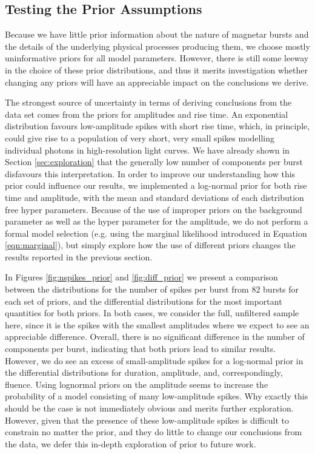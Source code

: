 \documentclass[12pt]{emulateapj}
\begin{document}
\subsection{Testing the Prior Assumptions}

Because we have little prior information about the nature of magnetar bursts and the details of
the underlying physical processes producing them, we choose mostly uninformative priors for all model parameters. However,
there is still some leeway in the choice of these prior distributions, and thus it merits investigation whether changing
any priors will have an appreciable impact on the conclusions we derive. 

The strongest source of uncertainty in terms of deriving conclusions from the data set comes from the priors for
amplitudes and rise time. An exponential distribution favours low-amplitude spikes with short rise time, which, in principle,
could give rise to a population of very short, very small spikes modelling individual photons in high-resolution light curves. We have already shown in 
Section \ref{sec:exploration} that the generally low number of components per burst disfavours this interpretation. In order
to improve our understanding how this prior could influence our results, we implemented a log-normal prior for both rise time
and amplitude, with the mean and standard deviations of each distribution free hyper parameters. Because of the use of improper priors
on the background parameter as well as the hyper parameter for the amplitude, we do not perform a formal model selection
(e.g. using the marginal likelihood introduced in Equation \ref{eqn:marginal}), but simply explore how the use of different priors
changes the results reported in the previous section.







In Figures \ref{fig:nspikes_prior} and \ref{fig:diff_prior} we present a comparison between the distributions for the number of spikes 
per burst from $82$ bursts for each set of priors, and the differential distributions for the most important quantities for both priors.
In both cases, we consider the full, unfiltered sample here, since it is the spikes with the smallest amplitudes where we expect to see
an appreciable difference. Overall, there is no significant difference in the number of components per burst, indicating that both 
priors lead to similar results. However, we do see an excess of small-amplitude spikes for a log-normal prior in the differential 
distributions for duration, amplitude, and, correspondingly, fluence. Using lognormal priors on the amplitude seems to increase
the probability of a model consisting of many low-amplitude spikes. Why exactly this should be the case is not immediately 
obvious and merits further exploration. However, given that the presence of these low-amplitude spikes is difficult to constrain no matter
the prior, and they do little to change our conclusions from the data, we defer this in-depth exploration of prior to future work.
\end{document}
